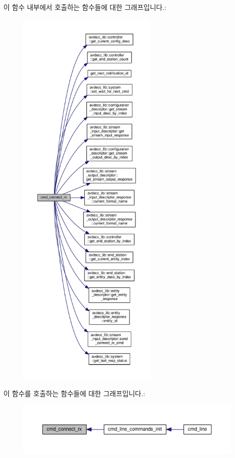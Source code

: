 이 함수 내부에서 호출하는 함수들에 대한 그래프입니다.\+:
\nopagebreak
\begin{figure}[H]
\begin{center}
\leavevmode
\includegraphics[height=550pt]{classcmd__line_a2c30ba2b18769889b2402e945919e600_cgraph}
\end{center}
\end{figure}




이 함수를 호출하는 함수들에 대한 그래프입니다.\+:
\nopagebreak
\begin{figure}[H]
\begin{center}
\leavevmode
\includegraphics[width=350pt]{classcmd__line_a2c30ba2b18769889b2402e945919e600_icgraph}
\end{center}
\end{figure}


